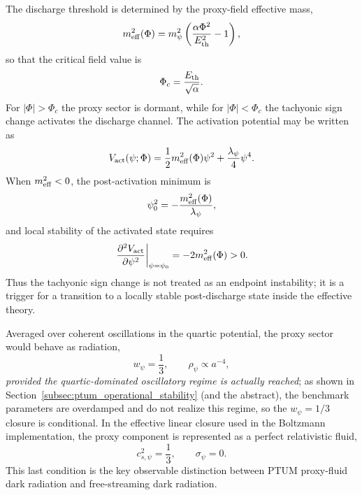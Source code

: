 \documentclass[epj]{svjour}
\begin{document}
The discharge threshold is determined by the proxy-field effective mass,
\begin{equation}
m_{\rm eff}^2(\Phi)
=
m_\psi^2
\left(
\frac{\alpha\Phi^2}{E_{\rm th}^2}-1
\right),
\label{eq:PTUM_meff_operational}
\end{equation}
so that the critical field value is
\begin{equation}
\Phi_c
=
\frac{E_{\rm th}}{\sqrt{\alpha}} .
\label{eq:PTUM_critical_phi_operational}
\end{equation}
For $|\Phi|>\Phi_c$ the proxy sector is dormant, while for
$|\Phi|<\Phi_c$ the tachyonic sign change activates the discharge channel.
The activation potential may be written as
\begin{equation}
V_{\rm act}(\psi;\Phi)
=
\frac{1}{2}m_{\rm eff}^2(\Phi)\psi^2
+
\frac{\lambda_\psi}{4}\psi^4 .
\label{eq:PTUM_activation_potential_operational}
\end{equation}
When $m_{\rm eff}^2<0$, the post-activation minimum is
\begin{equation}
\psi_0^2
=
-\frac{m_{\rm eff}^2(\Phi)}{\lambda_\psi},
\label{eq:PTUM_proxy_minimum_operational}
\end{equation}
and local stability of the activated state requires
\begin{equation}
\left.
\frac{\partial^2 V_{\rm act}}{\partial \psi^2}
\right|_{\psi=\psi_0}
=
-2m_{\rm eff}^2(\Phi)
>
0 .
\label{eq:PTUM_potential_stability_operational}
\end{equation}
Thus the tachyonic sign change is not treated as an endpoint instability;
it is a trigger for a transition to a locally stable post-discharge state
inside the effective theory.

Averaged over coherent oscillations in the quartic potential, the proxy sector
would behave as radiation,
\begin{equation}
w_\psi=\frac{1}{3},
\qquad
\rho_\psi\propto a^{-4},
\label{eq:PTUM_quartic_fluid_operational}
\end{equation}
\emph{provided the quartic-dominated oscillatory regime is actually
reached}; as shown in Section~\ref{subsec:ptum_operational_stability}
(and the abstract), the benchmark parameters are overdamped and do not
realize this regime, so the $w_\psi=1/3$ closure is conditional.
In the effective linear closure used in the Boltzmann implementation, the
proxy component is represented as a perfect relativistic fluid,
\begin{equation}
c_{s,\psi}^2=\frac{1}{3},
\qquad
\sigma_\psi=0 .
\label{eq:PTUM_proxy_signature_operational}
\end{equation}
This last condition is the key observable distinction between PTUM proxy-fluid
dark radiation and free-streaming dark radiation.
\end{document}

